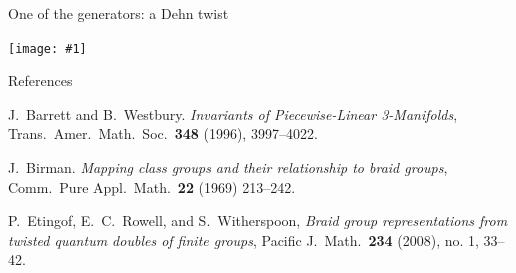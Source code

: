 \documentclass[final,t, mathserif]{beamer}
\newcommand{\img}[1]{
\vfill
\centering
\texttt{[image: \#1]}
\vfill}
\theoremstyle{plain}
\newtheorem{prop}[thm]{Proposition}
\theoremstyle{definition}
\begin{document}
\begin{frame}{}
\begin{columns}[t]
\begin{column}{.3\linewidth}
  
\begin{block}{One of the generators: a Dehn twist}
\img{t1}
\end{block}






\begin{block}{References}


\scriptsize{
\begin{thebibliography}{0}

 J.\ Barrett and B.\ Westbury. {\em Invariants
of Piecewise-Linear 3-Manifolds}, Trans.\ Amer.\ Math.\ Soc.\ \textbf{348} (1996), 3997--4022.

 J.\ Birman. \emph{Mapping class groups and their relationship to braid groups}, Comm.\ Pure Appl.\ Math.\ \textbf{22} (1969) 213--242.


 P.\ Etingof, E.\ C.\ Rowell, and S.\ Witherspoon, \emph{Braid group representations from twisted quantum doubles of finite groups}, Pacific J.\ Math.\ \textbf{234} (2008), no. 1, 33--42.



\end{thebibliography}}
\end{block}
\end{column}
\end{columns}
\end{frame}
\end{document}
